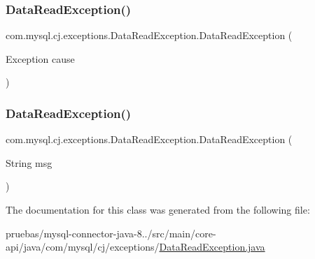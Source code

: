 \subsubsection{\texorpdfstring{Data\+Read\+Exception()}{DataReadException()}\hspace{0.1cm}{\footnotesize\ttfamily [1/2]}}
{\footnotesize\ttfamily com.\+mysql.\+cj.\+exceptions.\+Data\+Read\+Exception.\+Data\+Read\+Exception (\begin{DoxyParamCaption}\item[{Exception}]{cause }\end{DoxyParamCaption})}

\mbox{\label{classcom_1_1mysql_1_1cj_1_1exceptions_1_1_data_read_exception_a34be28306c933033e6dd220c1547db1a}} 
\subsubsection{\texorpdfstring{Data\+Read\+Exception()}{DataReadException()}\hspace{0.1cm}{\footnotesize\ttfamily [2/2]}}
{\footnotesize\ttfamily com.\+mysql.\+cj.\+exceptions.\+Data\+Read\+Exception.\+Data\+Read\+Exception (\begin{DoxyParamCaption}\item[{String}]{msg }\end{DoxyParamCaption})}



The documentation for this class was generated from the following file\+:\begin{DoxyCompactItemize}
\item 
pruebas/mysql-\/connector-\/java-\/8../src/main/core-\/api/java/com/mysql/cj/exceptions/\mbox{\hyperlink{_data_read_exception_8java}{Data\+Read\+Exception.\+java}}\end{DoxyCompactItemize}

